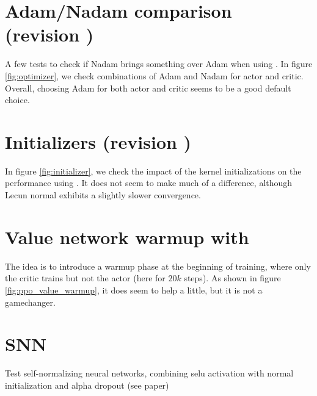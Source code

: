\section{Adam/Nadam comparison (revision )}

A few tests to check if Nadam brings something over Adam when using \ppo. In figure \ref{fig:optimizer}, we check combinations of Adam and Nadam for actor and critic. Overall, choosing Adam for both actor and critic seems to be a good default choice.



\section{Initializers (revision )}

In figure \ref{fig:initializer}, we check the impact of the kernel initializations on the performance using \ppo. It does not seem to make much of a difference, although Lecun normal exhibits a slightly slower convergence.



\section{Value network warmup with \ppo}

The idea is to introduce a warmup phase at the beginning of training, where only the critic trains but not the actor (here for $20k$ steps). As shown in figure \ref{fig:ppo_value_warmup}, it does seem to help a little, but it is not a gamechanger.



\section{SNN}

Test self-normalizing neural networks, combining selu activation with normal initialization and alpha dropout (see paper)

